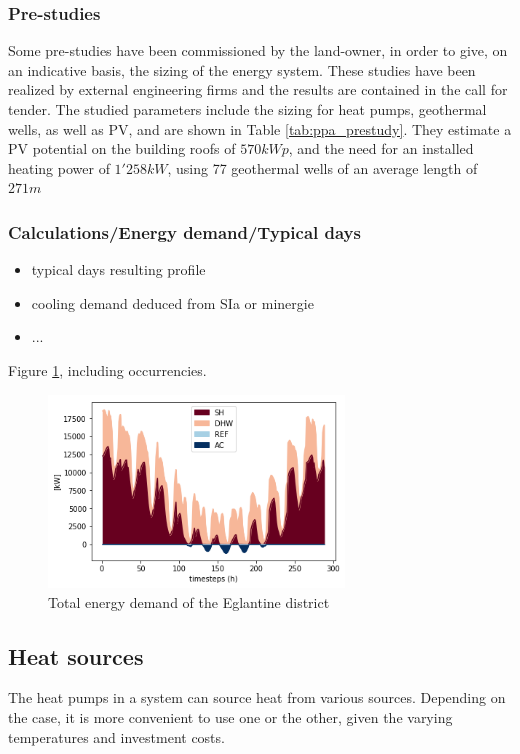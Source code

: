 \documentclass{article}
\begin{document}
\subsubsection{Pre-studies}
Some pre-studies have been commissioned by the land-owner, in order to give, on an indicative basis, the sizing of the energy system. These studies have been realized by external engineering firms and the results are contained in the call for tender. The studied parameters include the sizing for heat pumps, geothermal wells, as well as PV, and are shown in Table \ref{tab:ppa_prestudy}. They estimate a PV potential on the building roofs of $570 kWp$, and the need for an installed heating power of $1'258 kW$, using 77 geothermal wells of an average length of $271 m$


\subsubsection{Calculations/Energy demand/Typical days}

\begin{itemize}
	\item typical days resulting profile
	\item cooling demand deduced from SIa or minergie
	\item ...
\end{itemize}

Figure \ref{fig:energyDemand}, including occurrencies. 

\begin{figure}[h!]
	\centering
	\includegraphics[width=0.7\textwidth]{energy_demand.png}
	\caption{Total energy demand of the Eglantine district}
	\label{fig:energyDemand}
\end{figure}


\subsection{Heat sources}
The heat pumps in a system can source heat from various sources. Depending on the case, it is more convenient to use one or the other, given the varying temperatures and investment costs.
\end{document}

